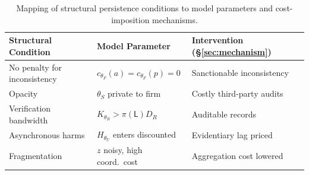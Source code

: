 \begin{table}[t]
\centering
\scriptsize
\setlength{\tabcolsep}{3pt}
\renewcommand{\arraystretch}{1.2}
\begin{tabular}{@{}p{2.7cm}p{2.2cm}p{2.7cm}@{}}
\toprule
\textbf{Structural Condition} & \textbf{Model Parameter} & \textbf{Intervention (\S\ref{sec:mechanism})} \\
\midrule
No penalty for inconsistency & $c_{\theta_F}(a)=c_{\theta_F}(p)=0$ & Sanctionable inconsistency \\
Opacity & $\theta_S$ private to firm & Costly third-party audits \\
Verification bandwidth & $K_{\theta_R}>\pi(\mathsf{L})D_R$ & Auditable records \\
Asynchronous harms & $H_{\theta_U}$ enters discounted & Evidentiary lag priced \\
Fragmentation & $z$ noisy, high coord.\ cost & Aggregation cost lowered \\
\bottomrule
\end{tabular}
\caption{Mapping of structural persistence conditions to model parameters and cost-imposition mechanisms.}
\label{tab:condition-map}
\end{table}
